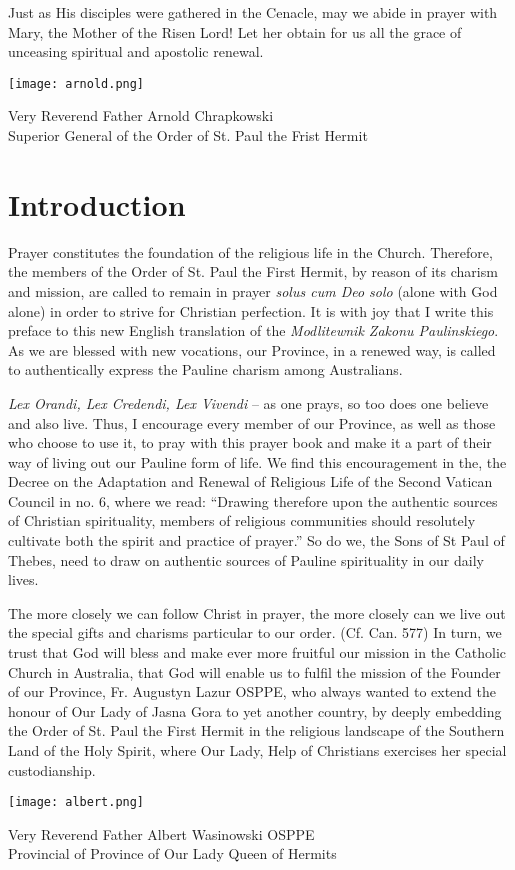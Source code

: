 {Just as His disciples were gathered in the Cenacle, may we abide in prayer with Mary, the Mother of the Risen Lord! Let her obtain for us all the grace of unceasing spiritual and apostolic renewal.\par}


\begin{flushright}
    \texttt{[image: arnold.png]}

    Very Reverend Father Arnold Chrapkowski \\
    Superior General of the Order of St. Paul the Frist Hermit
\end{flushright}

\section*{Introduction}

Prayer constitutes the foundation of the religious life in the Church. Therefore, the members of the Order of St. Paul the First Hermit, by reason of its charism and mission, are called to remain in prayer \textit{solus cum Deo solo} (alone with God alone) in order to strive for Christian perfection. It is with joy that I write this preface to this new English translation of the \textit{Modlitewnik Zakonu Paulinskiego}. As we are blessed with new vocations, our Province, in a renewed way, is called to authentically express the Pauline charism among Australians.

\textit{Lex Orandi, Lex Credendi, Lex Vivendi} -- as one prays, so too does one believe and also live. Thus, I encourage every member of our Province, as well as those who choose to use it, to pray with this prayer book and make it a part of their way of living out our Pauline form of life. We find this encouragement in the, the Decree on the Adaptation and Renewal of Religious Life of the Second Vatican Council in no. 6, where we read: ``Drawing therefore upon the authentic sources of Christian spirituality, members of religious communities should resolutely cultivate both the spirit and practice of prayer.'' So do we, the Sons of St Paul of Thebes, need to draw on authentic sources of Pauline spirituality in our daily lives.

The more closely we can follow Christ in prayer, the more closely can we live out the special gifts and charisms particular to our order. (Cf. Can. 577) In turn, we trust that God will bless and make ever more fruitful our mission in the Catholic Church in Australia, that God will enable us to fulfil the mission of the Founder of our Province, Fr. Augustyn Lazur OSPPE, who always wanted to extend the honour of Our Lady of Jasna Gora to yet another country, by deeply embedding the Order of St. Paul the First Hermit in the religious landscape of the Southern Land of the Holy Spirit, where Our Lady, Help of Christians exercises her special custodianship.

\begin{flushright}
    \texttt{[image: albert.png]}

    Very Reverend Father Albert Wasinowski OSPPE \\
    Provincial of Province of Our Lady Queen of Hermits
\end{flushright}

\setlength{\parskip}{0em}

\newpage
